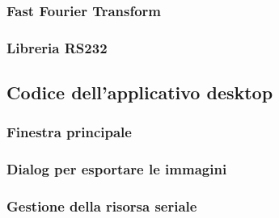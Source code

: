 \documentclass[a4paper, 10pt]{report}
\begin{document}
{        
        

        \subsubsection*{Fast Fourier Transform}
        
        

        
        \subsubsection*{Libreria RS232}
        
        

        \subsection*{Codice dell'applicativo desktop}
        

        \subsubsection*{Finestra principale}
        
        

        \subsubsection*{Dialog per esportare le immagini}
        
        

        \subsubsection*{Gestione della risorsa seriale}
        
        

        \clearpage
        \restoregeometry
    }
\end{document}
